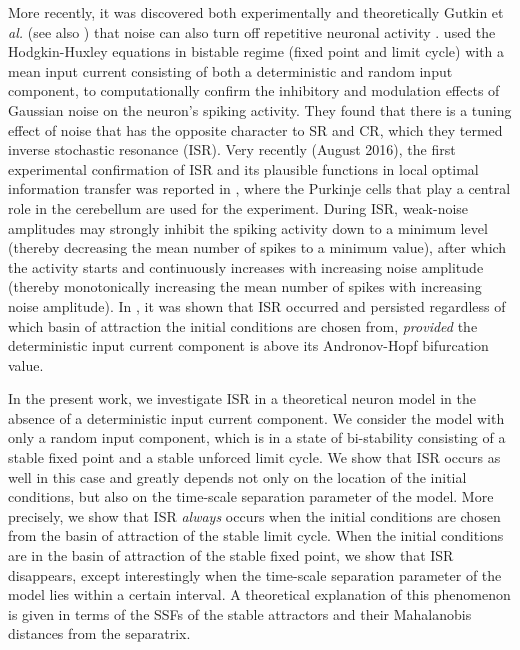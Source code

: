 More recently, it was
discovered both experimentally \cite{Paydarfar} and theoretically Gutkin et \textit{al.}
\cite{Gutkin1,Gutkin2} (see also \cite{Jost}) that noise can also  turn off repetitive
neuronal activity . 
\cite{Gutkin1,Gutkin2,Jost} used the Hodgkin-Huxley equations in bistable regime
(fixed point and limit cycle)
with a mean input current consisting of both a deterministic 
and random input component, to computationally confirm the
inhibitory and modulation effects of Gaussian noise on the neuron's 
spiking activity. 
They found that there is a tuning effect of noise that has the
opposite character to SR and CR, which they termed inverse
stochastic resonance (ISR). Very recently (August 2016),
the first experimental confirmation of ISR and its plausible functions in 
local optimal information transfer was reported in \cite{Buchin}, 
where the Purkinje cells that play a central role in the cerebellum are 
used for the experiment.
During ISR, weak-noise amplitudes may strongly inhibit the spiking 
activity down to a minimum level (thereby decreasing the mean 
number of spikes to a minimum value), after which the activity 
starts and continuously increases with increasing noise amplitude
(thereby monotonically increasing the mean number of spikes with 
increasing noise amplitude). In \cite{Gutkin1,Gutkin2}, it was shown 
that ISR  occurred and persisted regardless of which  basin of attraction the 
initial conditions are chosen from, \textit{provided} the deterministic 
input current component is above its Andronov-Hopf bifurcation value. 

In the present work, we investigate ISR in a theoretical neuron model in
the absence of a deterministic input current component. We consider
the model with only a random input component, which is
in a state of bi-stability consisting of a stable fixed point and a
stable unforced limit cycle. We show that ISR occurs as well in
this case and greatly depends not only on the location of the initial conditions,
but also on the time-scale separation
parameter of the model. More precisely, we show that ISR \textit{always} occurs when the 
initial conditions are chosen from the basin of attraction of the stable
limit cycle. When the initial conditions are in the basin of
attraction of the stable fixed point, we show that ISR disappears, 
except interestingly when
the time-scale separation parameter of the model lies within a certain interval. 
A theoretical explanation of this phenomenon is given in terms of 
the SSFs of the stable attractors and their 
Mahalanobis distances from the separatrix.

